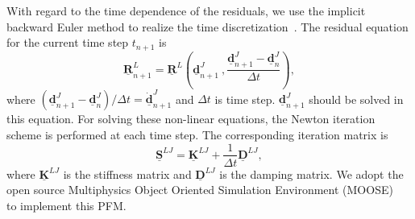 \documentclass[reprint,3p,sort&compress,times,onecolumn]{elsarticle}
\begin{document}
With regard to the time dependence of the residuals, we use the implicit backward Euler method to realize the time discretization~\cite{yi2014constraint}. The residual equation for the current time step $t_{n+1}$ is
\begin{equation}
\underline{\mathbf{R}}_{n+1}^L=\underline{\mathbf{R}}^L \left(\underline{\mathbf{d}}_{n+1}^J~,\frac{\underline{\mathbf{d}}_{n+1}^J-\underline{\mathbf{d}}_n^J}{\Delta t} \right),
\end{equation}
where $(\underline{\mathbf{d}}_{n+1}^J-\underline{\mathbf{d}}_n^J)/\Delta t = \underline{\mathbf{\dot{d}}}_{n+1}^J$ and $\Delta t$ is time step. $\underline{\mathbf{d}}_{n+1}^J$ should be solved in this equation.
For solving these non-linear equations, the Newton iteration scheme is performed at each time step. The corresponding iteration matrix is
\begin{equation}
\underline{\mathbf{S}}^{LJ}=\underline{\mathbf{K}}^{LJ}+\frac{1}{\Delta t}\underline{\mathbf{D}}^{LJ},
\end{equation}
where $\underline{\mathbf{K}}^{LJ}$ is the stiffness matrix and $\underline{\mathbf{D}}^{LJ}$ is the damping matrix. %
We adopt the open source Multiphysics Object Oriented Simulation Environment (MOOSE)~\cite{tonks2012object} to implement this PFM. %
\end{document}
